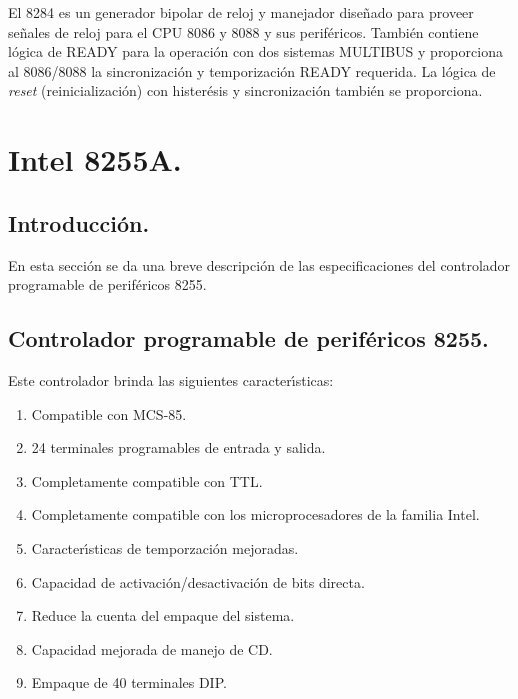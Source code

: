 El 8284 es un generador bipolar de reloj y manejador dise\~nado para proveer se\~nales de reloj %
para el CPU 8086 y  8088 y sus perif\'ericos. Tambi\'en contiene l\'ogica de READY para la %
operaci\'on con dos sistemas MULTIBUS y proporciona al 8086/8088 la sincronizaci\'on y %
temporizaci\'on READY requerida. La l\'ogica de {\it reset\/} (reinicializaci\'on) con %
hister\'esis y sincronizaci\'on tambi\'en se proporciona.


\section{Intel 8255A.}
\label{Section:8255}


\subsection{Introducci\'on.}
\label{Subsection:intro8255}

En esta secci\'on se da una breve descripci\'on de las especificaciones del controlador %
programable de perif\'ericos 8255.


\subsection{Controlador programable de perif\'ericos 8255.}
\label{Subsection:ppc8255}

Este controlador brinda las siguientes caracter\'{\i}sticas:

\begin{enumerate}
\item Compatible con MCS-85.
\item 24 terminales programables de entrada y salida.
\item Completamente compatible con TTL.
\item Completamente compatible con los microprocesadores de la familia Intel.
\item Caracter\'{\i}sticas de temporzaci\'on mejoradas.
\item Capacidad de activaci\'on/desactivaci\'on de bits directa.
\item Reduce la cuenta del empaque del sistema.
\item Capacidad mejorada de manejo de CD.
\item Empaque de 40 terminales DIP.
\end{enumerate}

